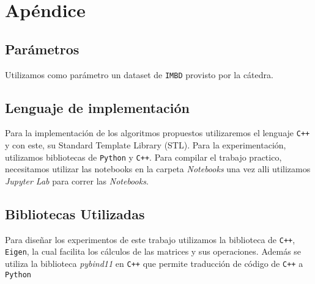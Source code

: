 
\section{Apéndice}

\subsection{Parámetros}
Utilizamos como parámetro un dataset de \texttt{IMBD} provisto por la cátedra. 

\subsection{Lenguaje de implementación}
Para la implementación de los algoritmos propuestos utilizaremos el lenguaje \texttt{C++} y con este, su Standard Template Library (STL).
Para la experimentación, utilizamos bibliotecas de \texttt{Python} y \texttt{C++}. Para compilar el trabajo practico, necesitamos utilizar las notebooks en la carpeta \textit{Notebooks} una vez alli utilizamos \textit{Jupyter Lab} para correr las \textit{Notebooks}.

\subsection{Bibliotecas Utilizadas}
Para diseñar los experimentos de este trabajo utilizamos la biblioteca de \texttt{C++}, \texttt{Eigen}, la cual facilita los cálculos de las matrices y sus operaciones. 
Además se utiliza la biblioteca \textit{pybind11} en \texttt{C++} que permite traducción de código de \texttt{C++} a \texttt{Python} 
